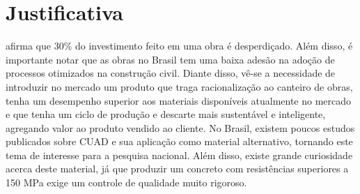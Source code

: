 







\chapter{Justificativa}

 afirma que 30\% do investimento feito em uma obra é desperdiçado. Além disso, é importante notar que as obras no Brasil tem uma baixa adesão na adoção de processos otimizados na construção civil. Diante disso, vê-se a necessidade de
introduzir no mercado um produto que traga racionalização ao canteiro de obras, tenha um desempenho superior aos materiais disponíveis atualmente no mercado e que tenha um ciclo de produção e descarte mais sustentável e inteligente, agregando valor ao produto vendido ao cliente. No Brasil, existem poucos estudos publicados sobre CUAD e sua aplicação como material alternativo, tornando este tema de interesse para a pesquisa nacional. Além disso, existe grande curiosidade acerca deste material, já que produzir um concreto com resistências superiores a 150 MPa exige um controle de qualidade muito rigoroso.

